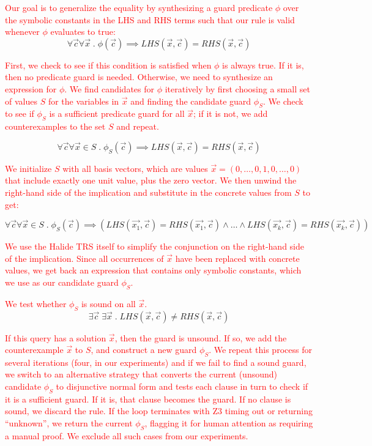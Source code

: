 \documentclass[acmsmall,review]{acmart}\settopmatter{printfolios=true,printccs=false,printacmref=false}
\newcommand{\modified}[1]{\textcolor{red}{{#1}}}
\begin{document}
\modified{Our goal is to generalize the equality by synthesizing a guard predicate $\phi$ 
over the symbolic constants in the LHS and RHS terms such that our rule is valid whenever
$\phi$ evaluates to true: }
\[ \forall \vec{c} \forall \vec{x} \;.\; \phi(\vec{c}) \implies LHS(\vec{x},\vec{c}) = RHS(\vec{x},\vec{c})
\]

\modified{First, we check to see if this condition is satisfied when $\phi$ is 
always true. If it is, then no predicate guard is needed. Otherwise, we need 
to synthesize an expression for $\phi$. We find candidates for $\phi$ iteratively 
by first choosing a small set of values $S$ for the variables 
in $\vec{x}$ and finding the candidate guard $\phi_S$. We check to see if $\phi_S$
is a sufficient predicate guard for all $\vec{x}$; if it is not, we add
counterexamples to the set $S$ and repeat.}

\[ \forall \vec{c} \forall \vec{x} \in S \;.\; \phi_S(\vec{c}) \implies LHS(\vec{x},\vec{c}) = RHS(\vec{x},\vec{c})
\]

\modified{We initialize $S$ with all basis vectors, which are 
values $\vec{x} = ( 0, \ldots, 0, 1, 0, \ldots, 0 )$ that include exactly one unit value,
plus the zero vector.  
We then unwind the right-hand side of the implication and substitute in the concrete values 
from $S$ to get:}

\[ \forall \vec{c} \forall \vec{x} \in S \;.\; \phi_S(\vec{c}) \implies (LHS(\vec{x_1},\vec{c}) = RHS(\vec{x_1},\vec{c}) \wedge \ldots \wedge
LHS(\vec{x_k},\vec{c}) = RHS(\vec{x_k},\vec{c}))
\]

\modified{We use the Halide TRS itself to simplify the conjunction on the right-hand side of the
implication. Since all occurrences of $\vec{x}$ have been replaced with concrete
values, we get back an expression that contains only symbolic constants, which we
use as our candidate guard $\phi_S$. }

\modified{We test whether $\phi_S$ is sound on all $\vec{x}$. }
\[ \exists \vec{c} \; \exists \vec{x} 
   \;.\; LHS(\vec{x},\vec{c}) \not= RHS(\vec{x},\vec{c})
\]

\modified{If this query has a solution $\vec{x}$, then the guard is unsound.  
If so, we add the counterexample $\vec{x}$ to $S$, and construct a new guard $\phi_S$.  
We repeat this process for several iterations (four, in our experiments) and if 
we fail to find a sound guard, we switch to an alternative strategy that converts 
the current (unsound) candidate $\phi_S$ to disjunctive normal form and tests
each clause in turn to check if it is a sufficient guard.
If it is, that clause becomes the guard.  If no clause is sound, we discard the rule.
If the loop terminates with Z3 timing out or returning ``unknown'', we return
the current $\phi_S$, flagging it for human attention as requiring a manual proof. 
We exclude all such cases from our experiments.}
\end{document}
